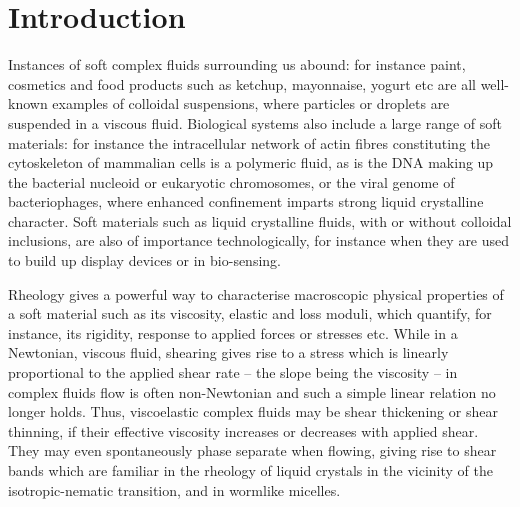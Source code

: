\documentclass[8.5pt,twoside,twocolumn]{article}
\begin{document}



\section{Introduction}
Instances of soft complex fluids surrounding us abound: for instance paint, cosmetics and food products such as ketchup, mayonnaise, yogurt etc are all well-known examples of colloidal suspensions, where particles or droplets are suspended in a viscous fluid. Biological systems also include a large range of soft materials: for instance the intracellular network of actin fibres constituting the cytoskeleton of mammalian cells is a polymeric fluid, as is the DNA making up the bacterial nucleoid or eukaryotic chromosomes, or the viral genome of bacteriophages, where enhanced confinement imparts strong liquid crystalline character. Soft materials such as liquid crystalline fluids, with or without colloidal inclusions, are also of importance technologically, for instance when they are used to build up display devices or in bio-sensing.

Rheology gives a powerful way to characterise macroscopic physical properties of a soft material such as its viscosity, elastic and loss moduli, which quantify, for instance, its rigidity, response to applied forces or stresses etc. While in a Newtonian, viscous fluid, shearing gives rise to a stress which is linearly proportional to the applied shear rate -- the slope being the viscosity -- in complex fluids flow is often non-Newtonian and such a simple linear relation no longer holds. Thus, viscoelastic complex fluids may be shear thickening or shear thinning, if their effective viscosity increases or decreases with applied shear. They may even spontaneously phase separate when flowing, giving rise to shear bands which are familiar in the rheology of liquid crystals in the vicinity of the isotropic-nematic transition, and in wormlike micelles.
\end{document}
